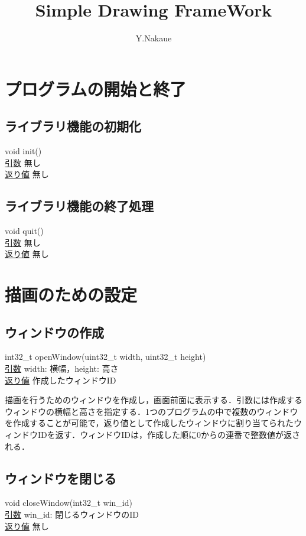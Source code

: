 \documentclass[a4paper, 11pt, oneside, onecolumn, openany]{jsarticle}
\begin{document}

\title{\vspace{-3cm}Simple Drawing FrameWork}
\author{Y.Nakaue}
\maketitle


\section{プログラムの開始と終了}
\subsection{ライブラリ機能の初期化}
\noindent
\tab void init() \\
\tab \underline{引数} \tab 無し \\
\tab \underline{返り値} \tab 無し \\

\subsection{ライブラリ機能の終了処理}
\tab void quit() \\
\tab \underline{引数} \tab 無し \\
\tab \underline{返り値} \tab 無し \\


\section{描画のための設定}
\subsection{ウィンドウの作成}
\noindent
\tab int32\_t openWindow(uint32\_t width, uint32\_t height) \\
\tab \underline{引数} \tab width: 横幅，height: 高さ \\
\tab \underline{返り値} \tab 作成したウィンドウID \\\par
描画を行うためのウィンドウを作成し，画面前面に表示する．引数には作成するウィンドウの横幅と高さを指定する．1つのプログラムの中で複数のウィンドウを作成することが可能で，返り値として作成したウィンドウに割り当てられたウィンドウIDを返す．ウィンドウIDは，作成した順に0からの連番で整数値が返される．

\subsection{ウィンドウを閉じる}
\noindent
\tab void closeWindow(int32\_t win\_id) \\
\tab \underline{引数} \tab win\_id: 閉じるウィンドウのID \\
\tab \underline{返り値} \tab 無し \\\par
\end{document}
